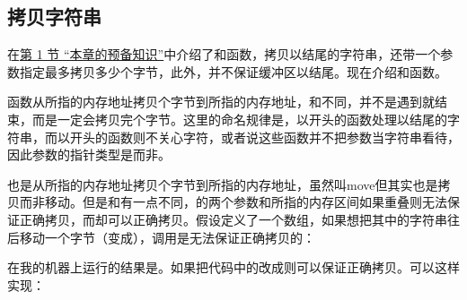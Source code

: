 \subsection{拷贝字符串}
%


在\hyperlink{db.ch24s01.id2818430}{第 1 节 “本章的预备知识”}中介绍了和函数，拷贝以结尾的字符串，还带一个参数指定最多拷贝多少个字节，此外，并不保证缓冲区以结尾。现在介绍和函数。




函数从所指的内存地址拷贝个字节到所指的内存地址，和不同，并不是遇到就结束，而是一定会拷贝完个字节。这里的命名规律是，以开头的函数处理以结尾的字符串，而以开头的函数则不关心字符，或者说这些函数并不把参数当字符串看待，因此参数的指针类型是而非。



也是从所指的内存地址拷贝个字节到所指的内存地址，虽然叫move但其实也是拷贝而非移动。但是和有一点不同，的两个参数和所指的内存区间如果重叠则无法保证正确拷贝，而却可以正确拷贝。假设定义了一个数组，如果想把其中的字符串往后移动一个字节（变成），调用是无法保证正确拷贝的：





在我的机器上运行的结果是。如果把代码中的改成则可以保证正确拷贝。可以这样实现：




